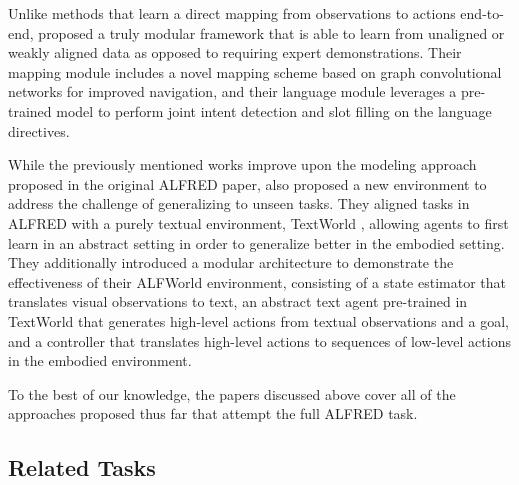 \documentclass[11pt,a4paper]{article}
\begin{document}
Unlike methods that learn a direct mapping from observations to actions end-to-end, \cite{Saha2021AMV} proposed a truly modular framework that is able to learn from unaligned or weakly aligned data as opposed to requiring expert demonstrations. Their mapping module includes a novel mapping scheme based on graph convolutional networks \cite{kipf2016semi} for improved navigation, and their language module leverages a pre-trained model to perform joint intent detection and slot filling on the language directives.

While the previously mentioned works improve upon the modeling approach proposed in the original ALFRED paper, \cite{Shridhar2020ALFWorldAT} also proposed a new environment to address the challenge of generalizing to unseen tasks. They aligned tasks in ALFRED with a purely textual environment, TextWorld \cite{Ct2018TextWorldAL}, allowing agents to first learn in an abstract setting in order to generalize better in the embodied setting. They additionally introduced a modular architecture to demonstrate the effectiveness of their ALFWorld environment, consisting of a state estimator that translates visual observations to text, an abstract text agent pre-trained in TextWorld that generates high-level actions from textual observations and a goal, and a controller that translates high-level actions to sequences of low-level actions in the embodied environment.

To the best of our knowledge, the papers discussed above cover all of the approaches proposed thus far that attempt the full ALFRED task.

\subsection{Related Tasks}
\end{document}
